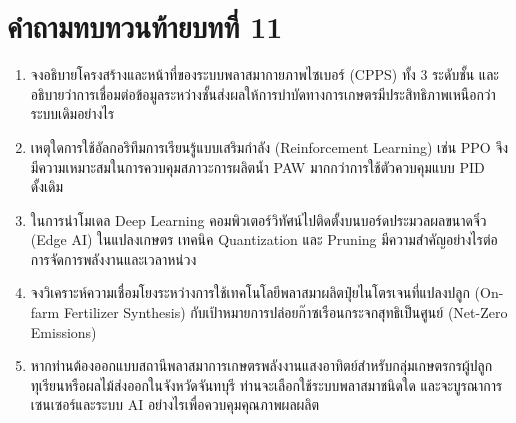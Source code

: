 \clearpage


\section*{คำถามทบทวนท้ายบทที่ 11}

\begin{enumerate}
    \item จงอธิบายโครงสร้างและหน้าที่ของระบบพลาสมากายภาพไซเบอร์ (CPPS) ทั้ง 3 ระดับชั้น และอธิบายว่าการเชื่อมต่อข้อมูลระหว่างชั้นส่งผลให้การบำบัดทางการเกษตรมีประสิทธิภาพเหนือกว่าระบบเดิมอย่างไร
    \item เหตุใดการใช้อัลกอริทึมการเรียนรู้แบบเสริมกำลัง (Reinforcement Learning) เช่น PPO จึงมีความเหมาะสมในการควบคุมสภาวะการผลิตน้ำ PAW มากกว่าการใช้ตัวควบคุมแบบ PID ดั้งเดิม
    \item ในการนำโมเดล Deep Learning คอมพิวเตอร์วิทัศน์ไปติดตั้งบนบอร์ดประมวลผลขนาดจิ๋ว (Edge AI) ในแปลงเกษตร เทคนิค Quantization และ Pruning มีความสำคัญอย่างไรต่อการจัดการพลังงานและเวลาหน่วง
    \item จงวิเคราะห์ความเชื่อมโยงระหว่างการใช้เทคโนโลยีพลาสมาผลิตปุ๋ยไนโตรเจนที่แปลงปลูก (On-farm Fertilizer Synthesis) กับเป้าหมายการปล่อยก๊าซเรือนกระจกสุทธิเป็นศูนย์ (Net-Zero Emissions)
    \item หากท่านต้องออกแบบสถานีพลาสมาการเกษตรพลังงานแสงอาทิตย์สำหรับกลุ่มเกษตรกรผู้ปลูกทุเรียนหรือผลไม้ส่งออกในจังหวัดจันทบุรี ท่านจะเลือกใช้ระบบพลาสมาชนิดใด และจะบูรณาการเซนเซอร์และระบบ AI อย่างไรเพื่อควบคุมคุณภาพผลผลิต
\end{enumerate}

\clearpage
